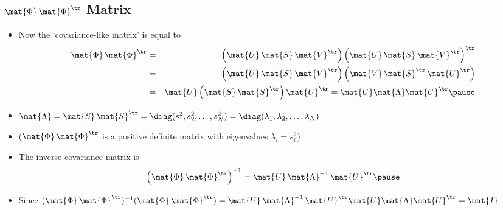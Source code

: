 \begin{slide}
\section[-2.5]{$\mat{\Phi}\,\mat{\Phi}^\tr$ Matrix}

\begin{PauseHighLight}

\begin{itemize}
\item Now the `covariance-like matrix' is equal to
  \begin{eqnarray*}
    \mat{\Phi}\,\mat{\Phi}^\tr &=& \left(\mat{U}\, \mat{S}\,
    \mat{V}^\tr\right)
    \left(\mat{U}\,\mat{S}\, \mat{V}^\tr\right)^\tr\\
    &=& \left(\mat{U}\, \mat{S}\, \mat{V}^\tr\right)
    \left(\mat{V}\, \mat{S}^\tr\, \mat{U}^\tr\right)\\
    &=& \mat{U}\left( \strut \mat{S}\,\mat{S}^\tr \right) \mat{U}^\tr
    = \mat{U} \mat{\Lambda} \mat{U}^\tr \pause
  \end{eqnarray*}
\item $\mat{\Lambda} = \mat{S}\,\mat{S}^\tr=\diag(s_1^2,s_2^2,\ldots,s_N^2) =
  \diag(\lambda_1, \lambda_2, \ldots, \lambda_N)$\pause
\item ($\mat{\Phi}\,\mat{\Phi}^\tr$ is a positive definite matrix with
eigenvalues $\lambda_i=s_i^2$)\pause
\item The inverse covariance matrix is
  \begin{displaymath}
    \left(\mat{\Phi}\,\mat{\Phi}^\tr\right)^{-1} = \mat{U}\,
    \mat{\Lambda}^{-1}\, \mat{U}^\tr\pause
  \end{displaymath}
\item Since
  $(\mat{\Phi}\,\mat{\Phi}^\tr)^{-1}(\mat{\Phi}\,\mat{\Phi}^\tr)=
  \mat{U}\,
    \mat{\Lambda}^{-1}\, \mat{U}^\tr \mat{U}\mat{\Lambda} \mat{U}^\tr =
    \mat{I}$\pause
\end{itemize}

\end{PauseHighLight}
\end{slide}



